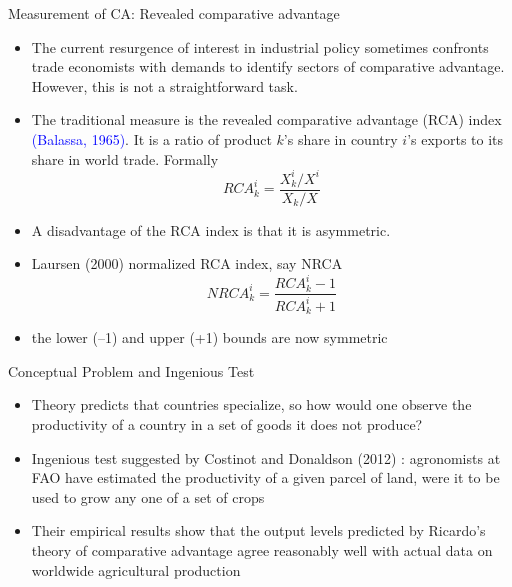 \documentclass[10pt,hyperref={CJKbookmarks=true},xcolor=dvipsnames,aspectratio=169]{beamer}
\begin{document}
\begin{frame}{Measurement of CA: Revealed comparative advantage}

\begin{itemize}
\item The current resurgence of interest in industrial policy sometimes
confronts trade economists with demands to identify sectors of comparative
advantage. However, this is not a straightforward task. 
\item The traditional measure is the revealed comparative advantage (RCA)
index\textcolor{blue}{{} (Balassa, 1965)}. It is a ratio of product
$k$’s share in country $i$’s exports to its share in world trade.
Formally
\[
RCA_{k}^{i}=\frac{X_{k}^{i}/X^{i}}{X_{k}/X}
\]

\item A disadvantage of the RCA index is that it is asymmetric.
\item Laursen (2000) normalized RCA index, say NRCA
\[
NRCA_{k}^{i}=\frac{RCA_{k}^{i}-1}{RCA_{k}^{i}+1}
\]

\item the lower (–1) and upper (+1) bounds are now symmetric
\end{itemize}
\end{frame}

\begin{frame}{Conceptual Problem and Ingenious Test }

\begin{itemize}
\item Theory predicts that countries specialize, so how would one observe
the productivity of a country in a set of goods it does not produce? 
\item Ingenious test suggested by Costinot and Donaldson (2012) : agronomists
at FAO have estimated the productivity of a given parcel of land,
were it to be used to grow any one of a set of crops 
\item Their empirical results show that the output levels predicted by Ricardo’s
theory of comparative advantage agree reasonably well with actual
data on worldwide agricultural production 
\end{itemize}
\end{frame}
\end{document}
